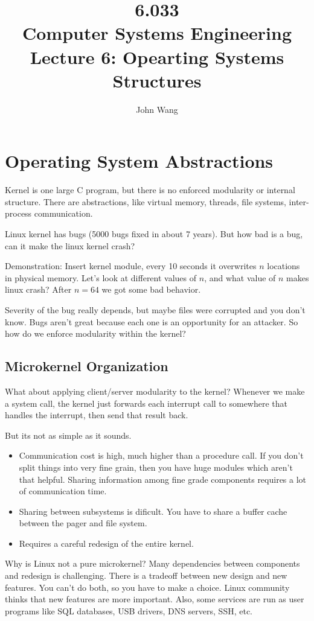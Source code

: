 \documentclass[psamsfonts]{amsart}
\title{6.033 \\
Computer Systems Engineering \\
Lecture 6: Opearting Systems Structures}
\author{John Wang}
\begin{document}
\maketitle

\section{Operating System Abstractions}

Kernel is one large C program, but there is no enforced modularity or internal structure. There are abstractions, like virtual memory, threads, file systems, inter-process communication.

Linux kernel has bugs (5000 bugs fixed in about 7 years). But how bad is a bug, can it make the linux kernel crash? 

Demonstration: Insert kernel module, every 10 seconds it overwrites $n$ locations in physical memory. Let's look at different values of $n$, and what value of $n$ makes linux crash? After $n=64$ we got some bad behavior.

Severity of the bug really depends, but maybe files were corrupted and you don't know. Bugs aren't great because each one is an opportunity for an attacker. So how do we enforce modularity within the kernel?

\subsection{Microkernel Organization}

What about applying client/server modularity to the kernel? Whenever we make a system call, the kernel just forwards each interrupt call to somewhere that handles the interrupt, then send that result back.

But its not as simple as it sounds.
\begin{itemize}
  \item Communication cost is high, much higher than a procedure call. If you don't split things into very fine grain, then you have huge modules which aren't that helpful. Sharing information among fine grade components requires a lot of communication time.
  \item Sharing between subsystems is dificult. You have to share a buffer cache between the pager and file system.
  \item Requires a careful redesign of the entire kernel.
\end{itemize}

Why is Linux not a pure microkernel? Many dependencies between components and redesign is challenging. There is a tradeoff between new design and new features. You can't do both, so you have to make a choice. Linux community thinks that new features are more important. Also, some services are run as user programs like SQL databases, USB drivers, DNS servers, SSH, etc.
\end{document}
